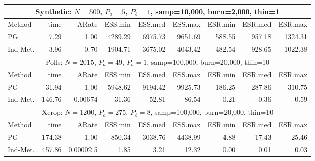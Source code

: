 \documentclass[11pt]{article}
\newcommand{\tablesize}{\small}
\begin{document}
\begin{table}
\tablesize
\centering
\label{tab:mm-examples}
\begin{tabular}{l r r r r r r r r } 
\hline
\multicolumn{9}{c}{Synthetic: $N=500$, $P_a=5$, $P_b=1$, samp=10,000, burn=2,000, thin=1} \\
\hline
Method   &     time &    ARate &  ESS.min &  ESS.med &  ESS.max &  ESR.min &  ESR.med &  ESR.max \\ 
PG       &     7.29 &     1.00 &  4289.29 &  6975.73 &  9651.69 &   588.55 &   957.18 &  1324.31 \\ 
Ind-Met. &     3.96 &     0.70 &  1904.71 &  3675.02 &  4043.42 &   482.54 &   928.65 &  1022.38 \\

\hline
\multicolumn{9}{c}{Polls: $N=2015$, $P_a=49$, $P_b=1$, samp=100,000, burn=20,000, thin=10} \\
\hline
Method   &     time &    ARate &  ESS.min &  ESS.med &  ESS.max &  ESR.min &  ESR.med &  ESR.max \\ 
PG       &    31.94 &     1.00 &  5948.62 &  9194.42 &  9925.73 &   186.25 &   287.86 &   310.75 \\ 
Ind-Met. &   146.76 &  0.00674 &    31.36 &    52.81 &    86.54 &     0.21 &     0.36 &     0.59 \\


\hline
\multicolumn{9}{c}{Xerop: $N=1200$, $P_a=275$, $P_b=8$, samp=100,000, burn=20,000, thin=10} \\
\hline
Method   &     time &     ARate &  ESS.min &  ESS.med &  ESS.max &  ESR.min &  ESR.med &  ESR.max \\ 
PG       &   174.38 &      1.00 &   850.34 &  3038.76 &  4438.99 &     4.88 &    17.43 &    25.46 \\ 
Ind-Met. &   457.86 & 0.00002.5 &     1.85 &     3.21 &    12.32 &     0.00 &     0.01 &     0.03
\end{tabular}


\end{table}
\end{document}
